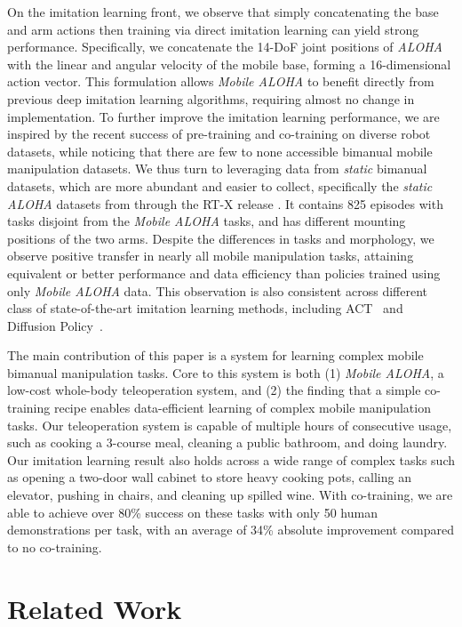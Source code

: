 \documentclass[11pt, a4paper, logo, twocolumn]{stanford}
\newcommand{\method}{\textit{Mobile ALOHA} }
\newcommand{\methodcomma}{\textit{Mobile ALOHA}}
\newcommand{\aloha}{\textit{ALOHA} }
\newcommand{\staticaloha}{\textit{static ALOHA} }
\begin{document}
On the imitation learning front, we observe that simply concatenating the base and arm actions then training via direct imitation learning can yield strong performance. Specifically, we concatenate the 14-DoF joint positions of \aloha with the linear and angular velocity of the mobile base, forming a 16-dimensional action vector. This formulation allows \method to benefit directly from previous deep imitation learning algorithms, requiring almost no change in implementation.
To further improve the imitation learning performance, we are inspired by the recent success of pre-training and co-training on diverse robot datasets, while noticing that there are few to none accessible bimanual mobile manipulation datasets.
We thus turn to leveraging data from \textit{static} bimanual datasets, which are more abundant and easier to collect, specifically the \staticaloha datasets from \cite{zhao2023learning,shi2023waypoint} 
through the RT-X release \cite{open_x_embodiment_rt_x_2023}.
It contains 825 episodes with tasks disjoint from the \method tasks, and has different mounting positions of the two arms.
Despite the differences in tasks and morphology, we observe positive transfer in nearly all mobile manipulation tasks, attaining equivalent or better performance and data efficiency than policies trained using only \method data.
This observation is also consistent across different class of state-of-the-art imitation learning methods, including ACT~\cite{zhao2023learning} and Diffusion Policy~\cite{chi2023diffusionpolicy}. 


The main contribution of this paper is a system for learning complex mobile bimanual manipulation tasks. Core to this system is both (1) \methodcomma, a low-cost whole-body teleoperation system, and (2) the finding that a simple co-training recipe enables data-efficient learning of complex mobile manipulation tasks.
Our teleoperation system is capable of multiple hours of consecutive usage, such as cooking a 3-course meal, cleaning a public bathroom, and doing laundry.
Our imitation learning result also holds across a wide range of complex tasks such as opening a two-door wall cabinet to store heavy cooking pots, calling an elevator, pushing in chairs, and cleaning up spilled wine.
With co-training, we are able to achieve over 80\% success on these tasks with only 50 human demonstrations per task, with an average of 34\% absolute improvement compared to no co-training.



\section{Related Work}
\end{document}
